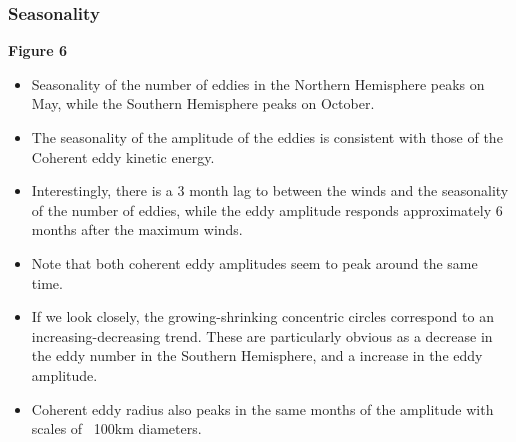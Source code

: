 \documentclass[draft,linenumbers]{agujournal2019}
\begin{document}
	\subsubsection{Seasonality}

	\textbf{Figure 6}
	\begin{itemize}
		\item Seasonality of the number of eddies in the Northern Hemisphere peaks on May, while the Southern Hemisphere peaks on October. 
		\item The seasonality of the amplitude of the eddies is consistent with those of the Coherent eddy kinetic energy. 
		\item Interestingly, there is a 3 month lag to between the winds and the seasonality of the number of eddies, while the eddy amplitude responds approximately 6 months after the maximum winds. 
		\item Note that both coherent eddy amplitudes seem to peak around the same time. 
		\item If we look closely, the growing-shrinking concentric circles correspond to an increasing-decreasing trend. These are particularly obvious as a decrease in the eddy number in the Southern Hemisphere, and a increase in the eddy amplitude. 
		\item Coherent eddy radius also peaks in the same months of the amplitude with scales of ~100km diameters.
	\end{itemize}
\end{document}
